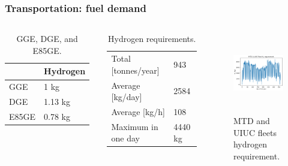 \begin{frame}
\frametitle{Transportation: fuel demand}
\begin{columns}
    \column[t]{5cm}
	\begin{table}[!htb]
		\centering
	    \caption{GGE, DGE, and E85GE.}
		\begin{tabular}{l|l}
		\hline
		                 & Hydrogen \\ \hline
		GGE              & 1 kg     \\
		DGE              & 1.13 kg  \\
		E85GE            & 0.78 kg  \\ \hline
        \end{tabular}
	\end{table}

	\begin{table}[!htb]
		\centering
	    \caption{Hydrogen requirements.}
		\begin{tabular}{l|l}
		\hline
		Total [tonnes/year]  & 943      \\
		Average [kg/day] 	 & 2584     \\
		Average [kg/h] 		 & 108      \\
		Maximum in one day   & 4440 kg  \\ \hline
        \end{tabular}
	\end{table}

	\column[t]{5cm}
	\begin{figure}[htbp!]
		\begin{center}
			\includegraphics[height=3.5cm]{images/hydro-fleet}
		\end{center}
		\caption{MTD and UIUC fleets hydrogen requirement.}
	\end{figure}

\end{columns}
\end{frame}


